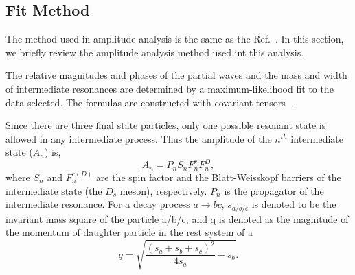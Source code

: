 \subsection{Fit Method}
\par{The method used in amplitude analysis is the same as the Ref.~\cite{Doc-DB-416-v30}. In this section, we briefly review the amplitude analysis method used int this analysis.
    
    The relative magnitudes and phases of the partial waves and the mass and width of intermediate resonances are determined by a maximum-likelihood fit to the data selected. The formulas are constructed with covariant tensors ~\cite{covariant-tensors}.

    Since there are three final state particles, only one possible resonant state is allowed in any intermediate process. Thus the amplitude of the $n^{th}$ intermediate state ($A_{n}$) is,
    \begin{equation}
    A_{n} = P_{n}S_{n}F_{n}^{r}F_{n}^{D}, \label{base-amplitude}
    \end{equation}
where $S_{n}$ and $F_{n}^{r(D)}$ are the spin factor and the Blatt-Weisskopf barriers of the intermediate state (the $D_{s}$ meson), respectively. $P_{n}$ is the propagator of the intermediate resonance. For a decay process $a \rightarrow bc$, $s_{a/b/c}$ is denoted to be the invariant mass square of the particle a/b/c, and q is denoted as the magnitude of the momentum of daughter particle in the rest system of a
    \begin{equation}
    q=\sqrt{ \frac{(s_{a} + s_{b} + s_{c})^{2}}{4s_{a}} - s_{b}}. \label{base-q}
    \end{equation}
    
}

